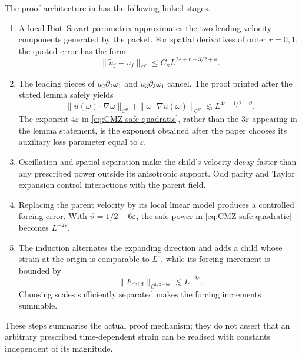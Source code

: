 \documentclass[11pt]{amsart}
\numberwithin{equation}{section}
\theoremstyle{plain}
\theoremstyle{definition}
\theoremstyle{remark}
\newcommand{\eps}{\varepsilon}
\begin{document}
The proof architecture in \cite{CordobaMartinezZoroa2023} has the following
linked stages.
\begin{enumerate}[label=\textup{C\arabic*.},leftmargin=*]
\item A local Biot--Savart parametrix approximates the two leading velocity
components generated by the packet.  For spatial derivatives of order
$r=0,1$, the quoted error has the form
\begin{equation}
\|\widetilde u_j-u_j\|_{C^r}
\le C_\kappa L^{2\eps+r-3/2+\kappa}.
\label{eq:CMZ-parametrix-error}
\end{equation}
\item The leading pieces of
$\widetilde u_2\partial_2\omega_1$ and
$\widetilde u_3\partial_3\omega_1$ cancel.  The proof printed after the
stated lemma safely yields
\begin{equation}
\|u(\omega)\cdot\nabla\omega\|_{C^\vartheta}
+\|\omega\cdot\nabla u(\omega)\|_{C^\vartheta}
\lesssim L^{4\eps-1/2+\vartheta}.
\label{eq:CMZ-safe-quadratic}
\end{equation}
The exponent $4\eps$ in \eqref{eq:CMZ-safe-quadratic}, rather than the
$3\eps$ appearing in the lemma statement, is the exponent obtained after the
paper chooses its auxiliary loss parameter equal to $\eps$.
\item Oscillation and spatial separation make the child's velocity decay
faster than any prescribed power outside its anisotropic support.  Odd parity
and Taylor expansion control interactions with the parent field.
\item Replacing the parent velocity by its local linear model produces a
controlled forcing error.  With
$\vartheta=1/2-6\eps$, the safe power in
\eqref{eq:CMZ-safe-quadratic} becomes $L^{-2\eps}$.
\item The induction alternates the expanding direction and adds a child
whose strain at the origin is comparable to $L^\eps$, while its forcing
increment is bounded by
\begin{equation}
\|F_{\mathrm{child}}\|_{C^{1/2-6\eps}}
\lesssim L^{-2\eps}.
\label{eq:CMZ-force-increment}
\end{equation}
Choosing scales sufficiently separated makes the forcing increments summable.
\end{enumerate}

These steps summarise the actual proof mechanism; they do not assert that an
arbitrary prescribed time-dependent strain can be realised with constants
independent of its magnitude.
\end{document}
